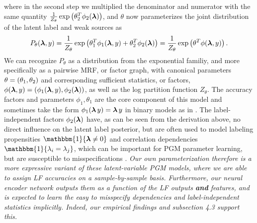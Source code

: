 \documentclass{article}
\newcommand{\indicator}[1]{\mathbbm{1}\{ #1 \}}
\begin{document}
where in the second step we multiplied the denominator and numerator with the same quantity $\frac{1}{Z_\theta}\exp\left( \theta_2^T\phi_2(\operatorname{\bm{\lambda}}) \right)$, and $\theta$ now parameterizes the joint distribution of the latent label and weak sources as 
$$
P_\theta(\operatorname{\bm{\lambda}}, y) = \frac{1}{Z_\theta} \exp\left( \theta_1^T\phi_1(\operatorname{\bm{\lambda}}, y) + \theta_2^T\phi_2(\operatorname{\bm{\lambda}}) \right) = \frac{1}{Z_\theta} \exp\left( \theta^T\phi(\operatorname{\bm{\lambda}}, y) \right).
$$ 
We can recognize $P_\theta$ as a distribution from the exponential familiy, and more specifically as a pairwise MRF, or factor graph, with canonical parameters $\theta = \left( \theta_1, \theta_2 \right)$ and corresponding sufficient statistics, or factors, $\phi(\operatorname{\bm{\lambda}}, y) = \left( \phi_1(\operatorname{\bm{\lambda}}, y), \phi_2(\operatorname{\bm{\lambda}}) \right)$, as well as the log partition function $Z_\theta$.
The accuracy factors and parameters $\phi_1, \theta_1$ are the core component of this model and sometimes take the form $\phi_1(\operatorname{\bm{\lambda}} y) = \operatorname{\bm{\lambda}} y$ in binary models as in \cite{DP, triplets, TripletsMean}.
The label-independent factors $\phi_2(\operatorname{\bm{\lambda}})$ have, as can be seen from the derivation above, no direct influence on the latent label posterior, but are often used to model labeling propensities $\indicator{\lfs \neq 0}$ and correlation dependencies $\indicator{\lambda_i = \lambda_j}$, which can be important for PGM parameter learning, but are susceptible to misspecifications \cite{structureLearning2, TripletsMean, MisspecificationInDP}.
\emph{Our own parameterization therefore is a more expressive variant of these latent-variable PGM models, where we are able to assign LF accuracies on a sample-by-sample basis. Furthermore, our neural encoder network outputs them as a function of the LF outputs \textbf{and} features, and is expected to learn the easy to misspecify dependencies and label-independent statistics implicitly. Indeed, our empirical findings and subsection 4.3 support this.}
\end{document}
